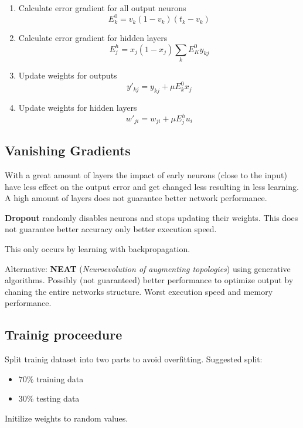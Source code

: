 \documentclass[
    fontsize      = 11pt,
    paper         = a4,
    twoside       = false,
    parskip       = half,
    pagesize      = false,
]{scrartcl}
\providecommand{\tightlist}{%
  \setlength{\itemsep}{0pt}\setlength{\parskip}{0pt}}
\begin{document}
\begin{enumerate}
\def\labelenumi{\arabic{enumi}.}
\tightlist
\item
  Calculate error gradient for all output neurons
  \[E_k^0 = v_k (1-v_k)(t_k-v_k)\]
\item
  Calculate error gradient for hidden layers
  \[E_j^h = x_j(1-x_j) \sum_k E_K^0 y_{kj}\]
\item
  Update weights for outputs \[y\prime_{kj} = y_{kj} + \mu E_k^0 x_j\]
\item
  Update weights for hidden layers
  \[w\prime_{ji} = w_{ji} + \mu E_j^h u_i\]
\end{enumerate}

\hypertarget{vanishing-gradients}{%
\subsection{Vanishing Gradients}\label{vanishing-gradients}}

With a great amount of layers the impact of early neurons (close to the
input) have less effect on the output error and get changed less
resulting in less learning. A high amount of layers does not guarantee
better network performance.

\textbf{Dropout} randomly disables neurons and stops updating their
weights. This does not guarantee better accuracy only better execution
speed.

This only occurs by learning with backpropagation.

Alternative: \textbf{NEAT} (\emph{Neuroevolution of augmenting
topologies}) using generative algorithms. Possibly (not guaranteed)
better performance to optimize output by chaning the entire networks
structure. Worst execution speed and memory performance.

\hypertarget{trainig-proceedure}{%
\subsection{Trainig proceedure}\label{trainig-proceedure}}

Split trainig dataset into two parts to avoid overfitting. Suggested
split:

\begin{itemize}
\tightlist
\item
  \(70\%\) training data
\item
  \(30\%\) testing data
\end{itemize}

Initilize weights to random values.
\end{document}
